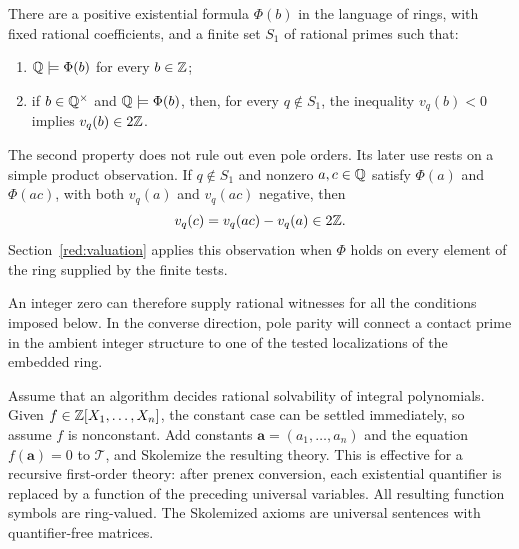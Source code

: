 \begin{proposition}\label{par:pole-parity}
There are a positive existential formula $\Phi(b)$ in the language of
rings, with fixed rational coefficients, and a finite set $S_1$ of
rational primes such that:
\begin{enumerate}
\item $\mathbb Q\models\Phi(b)$ for every $b\in\mathbb Z$;
\item if $b\in\mathbb Q^\times$ and $\mathbb Q\models\Phi(b)$, then, for every
$q\notin S_1$, the inequality $v_q(b)<0$ implies $v_q(b)\in2\mathbb Z$.
\end{enumerate}
\end{proposition}

The second property does not rule out even pole orders. Its later use rests on a
simple product observation. If $q\notin S_1$ and nonzero $a,c\in\mathbb Q$
satisfy $\Phi(a)$ and $\Phi(ac)$, with both $v_q(a)$ and $v_q(ac)$
negative, then
\[
                  v_q(c)=v_q(ac)-v_q(a)\in2\mathbb Z.
\]
Section~\ref{red:valuation} applies this observation when $\Phi$ holds
on every element of the ring supplied by the finite tests.

An integer zero can therefore supply rational witnesses for all the
conditions imposed below.  In the converse direction, pole parity will
connect a contact prime in the ambient integer structure to one of the
tested localizations of the embedded ring.

Assume that an algorithm decides rational solvability of integral
polynomials. Given $f\in\mathbb Z[X_1,\ldots,X_n]$, the constant case can be
settled immediately, so assume $f$ is nonconstant. Add constants
$\mathbf a=(a_1,\ldots,a_n)$ and the equation $f(\mathbf a)=0$ to
$\mathcal T$, and Skolemize the resulting theory. This is effective for
a recursive first-order theory: after prenex conversion, each existential
quantifier is replaced by a function of the preceding universal variables.
All resulting function symbols are ring-valued. The Skolemized axioms
are universal sentences with quantifier-free matrices.

